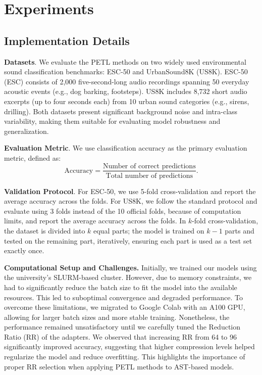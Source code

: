 \documentclass[11pt]{article}
\begin{document}
\section{Experiments}
\subsection{Implementation Details}

\textbf{Datasets}. We evaluate the PETL methods on two widely used environmental sound classification benchmarks: ESC-50 and UrbanSound8K (US8K). ESC-50 (ESC) \cite{piczak2015esc} consists of 2,000 five-second-long audio recordings spanning 50 everyday acoustic events (e.g., dog barking, footsteps). US8K \cite{salamon2014dataset} includes 8,732 short audio excerpts (up to four seconds each) from 10 urban sound categories (e.g., sirens, drilling). Both datasets present significant background noise and intra-class variability, making them suitable for evaluating model robustness and generalization.

\textbf{Evaluation Metric}. We use classification accuracy as the primary evaluation metric, defined as:
\begin{equation}
    \text{Accuracy} = \frac{\text{Number of correct predictions}}{\text{Total number of predictions}}.
\end{equation}

\textbf{Validation Protocol}. For ESC-50, we use 5-fold cross-validation and report the average accuracy across the folds. For US8K, we follow the standard protocol and evaluate using 3 folds instead of the 10 official folds, because of computation limits,  and report the average accuracy across the folds. In $k$-fold cross-validation, the dataset is divided into $k$ equal parts; the model is trained on $k-1$ parts and tested on the remaining part, iteratively, ensuring each part is used as a test set exactly once.



\textbf{Computational Setup and Challenges.} Initially, we trained our models using the university's SLURM-based cluster. However, due to memory constraints, we had to significantly reduce the batch size to fit the model into the available resources. This led to suboptimal convergence and degraded performance. To overcome these limitations, we migrated to Google Colab with an A100 GPU, allowing for larger batch sizes and more stable training. Nonetheless, the performance remained unsatisfactory until we carefully tuned the Reduction Ratio (RR) of the adapters. We observed that increasing RR from 64 to 96 significantly improved accuracy, suggesting that higher compression levels helped regularize the model and reduce overfitting. This highlights the importance of proper RR selection when applying PETL methods to AST-based models.
\end{document}
